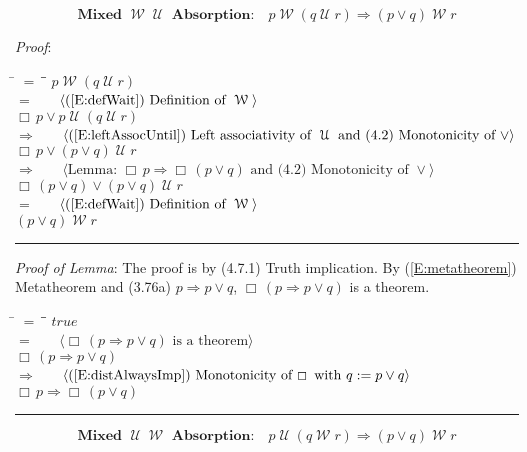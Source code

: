 \documentclass[12pt, fleqn, leqno]{article}
\newcommand{\lgap}{2pt}                             %
\newcommand{\mymathindent}{24pt}                    %
\newcommand{\impl}{\ensuremath{\Rightarrow}}        %
\newcommand{\Until}{\;\mathcal{U}\;}
\newcommand{\Wait}{\;\mathcal{W}\;}
\newcommand{\Always}{\Box\,}
\newcommand{\myqed}{\rule[-.23ex]{1.2ex}{2.0ex}}
\newcommand{\myqedtab}{\hspace{384pt}}              %
\newcommand{\Gll} {\langle}                         %
\newcommand{\Ggg} {\rangle}                         %
\newcommand{\Hint}[1]     {\ \ \ $\Gll              \mbox{#1} \Ggg$ }   %
\begin{document}
\begin{equation}\label{E:mix4untilImpAbsR}
\textbf{Mixed $\Wait\Until$ Absorption:}\quad p \Wait (q \Until r) \impl (p \lor q) \Wait r
\end{equation}

\emph{Proof}:
\begin{tabbing}
\hspace{\mymathindent} \= $= \;$ \= \myqedtab \= \kill
\> \>   $p \Wait (q \Until r)$\\[\lgap]
\> $=$ \> \Hint{(\ref{E:defWait}) Definition of $\Wait$} \\[\lgap]
\> \>   $\Always p \lor p\Until ( q \Until r)$\\[\lgap]
\> $\impl$ \> \Hint{(\ref{E:leftAssocUntil}) Left associativity of $\Until$ and (4.2) Monotonicity of $\lor$} \\[\lgap]
\> \>   $\Always p\lor (p\lor q) \Until r$\\[\lgap]
  \> $\impl$  \>  \Hint{Lemma: $\Always p \impl \Always (p \lor q)$ and (4.2) Monotonicity of $\lor$}\\[\lgap]
\> \>   $\Always (p \lor q) \lor (p\lor q) \Until r$\\[\lgap]
\> $=$ \> \Hint{(\ref{E:defWait}) Definition of $\Wait$} \\[\lgap]
\> \>   $(p\lor q) \Wait r$ \quad \myqed
\end{tabbing}

\emph{Proof of Lemma}: The proof is by (4.7.1) Truth implication.
By (\ref{E:metatheorem}) Metatheorem and (3.76a) $p\impl p\lor q$, $\Always (p\impl p\lor q)$ is a theorem.
\begin{tabbing}
\hspace{\mymathindent} \= $= \;$ \= \myqedtab \= \kill
  \> \>   $true$\\[\lgap]
  \> $=$ \> \Hint{$\Always (p\impl p\lor q)$ is a theorem} \\[\lgap]
  \> \>   $\Always (p\impl p\lor q)$\\[\lgap]
  \> $\impl$  \>  \Hint{(\ref{E:distAlwaysImp}) Monotonicity of $\Always$ with $q :=  p\lor q$}\\[\lgap]
  \> \>   $\Always p \impl \Always (p \lor q)$ \quad \myqed
\end{tabbing}

\begin{equation}\label{E:mix5untilImpAbsR}
\textbf{Mixed $\Until\Wait$ Absorption:}\quad p \Until (q \Wait r) \impl (p \lor q) \Wait r
\end{equation}
\end{document}
